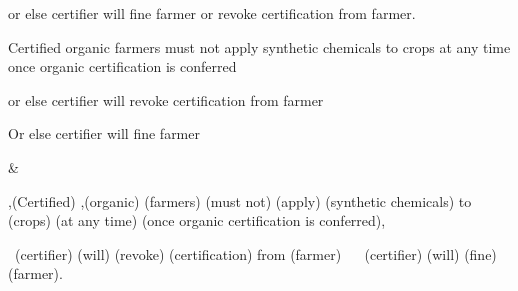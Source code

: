 \begin{landscape}
\begin{longtable}{\tabledims}

\begin{exi}or else certifier will fine farmer or revoke certification from farmer.\end{exi}

\sp


\sp

\begin{exi}Certified organic farmers must not apply synthetic chemicals to crops at any time once organic certification is conferred\end{exi}

\sp


\sp

\begin{exi}or else certifier will revoke certification from farmer\end{exi}

\sp


\sp


\sp

\begin{exi}Or else certifier will fine farmer\end{exi}

&


\begin{exa}\A{},(Certified) \A{},(organic) \A{}(farmers) \D{}(must not) \I{}(apply) \Bdir{}(synthetic chemicals) to \Bind{}(crops) \Cex{}(at any time) \Cac{}(once organic certification is conferred), 

\Oe{}~\lb\lb \A{}(certifier) \D{}(will) \I{}(revoke) \Bdir{}(certification) from \Bind{}(farmer)\rb~
\XOR~ 
\lb \A{}(certifier) \D{}(will) \I{}(fine) \Bdir{}(farmer)\rb \rb.\end{exa}

\\


\end{longtable}
\end{landscape}
